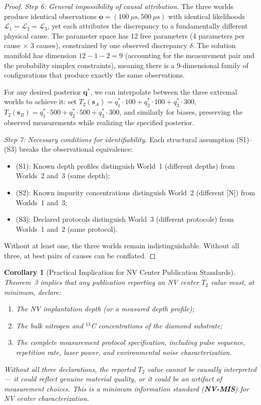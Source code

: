 \documentclass[11pt,a4paper]{article}
\newtheorem{corollary}[theorem]{Corollary}
\theoremstyle{definition}
\newcommand{\Ttwo}{T_2}
\newcommand{\NV}{NV}
\begin{document}
\begin{proof}
\medskip\noindent\textit{Step 6: General impossibility of causal attribution.}
The three worlds produce identical observations $\mathbf{o} = (100~\mu\text{s}, 500~\mu\text{s})$
with identical likelihoods $\mathcal{L}_1 = \mathcal{L}_2 = \mathcal{L}_3$,
yet each attributes the discrepancy to a fundamentally different physical cause.
The parameter space has 12 free parameters (4 parameters per cause $\times$ 3 causes),
constrained by one observed discrepancy $\delta$. The solution manifold has
dimension $12 - 1 - 2 = 9$ (accounting for the measurement pair and the
probability simplex constraints), meaning there is a 9-dimensional family of
configurations that produce exactly the same observations.

For any desired posterior $\mathbf{q}^*$, we can interpolate between the
three extremal worlds to achieve it: set $\Ttwo(\mathbf{s}_A) = q_1^* \cdot 100 + q_2^* \cdot 100 + q_3^* \cdot 300$,
$\Ttwo(\mathbf{s}_B) = q_1^* \cdot 500 + q_2^* \cdot 500 + q_3^* \cdot 300$,
and similarly for biases, preserving the observed measurements while
realizing the specified posterior.

\medskip\noindent\textit{Step 7: Necessary conditions for identifiability.}
Each structural assumption (S1)--(S3) breaks the observational equivalence:
\begin{itemize}[nosep]
    \item (S1): Known depth profiles distinguish World~1 (different depths)
    from Worlds~2 and~3 (same depth);
    \item (S2): Known impurity concentrations distinguish World~2 (different
    [N]) from Worlds~1 and~3;
    \item (S3): Declared protocols distinguish World~3 (different protocols)
    from Worlds~1 and~2 (same protocol).
\end{itemize}
Without at least one, the three worlds remain indistinguishable.
Without all three, at best pairs of causes can be conflated.
\end{proof}

\begin{corollary}[Practical Implication for NV Center Publication Standards]
\label{cor:publication_standard}
Theorem~3 implies that any publication reporting an \NV{} center $\Ttwo$
value must, at minimum, declare:
\begin{enumerate}[label=(\roman*), nosep]
    \item The \NV{} implantation depth (or a measured depth profile);
    \item The bulk nitrogen and ${}^{13}$C concentrations of the diamond substrate;
    \item The complete measurement protocol specification, including pulse
    sequence, repetition rate, laser power, and environmental noise characterization.
\end{enumerate}
Without all three declarations, the reported $\Ttwo$ value cannot be
causally interpreted — it could reflect genuine material quality, or
it could be an artifact of measurement choices. This is a minimum
information standard (\textbf{NV-MIS}) for \NV{} center characterization.
\end{corollary}
\end{document}
